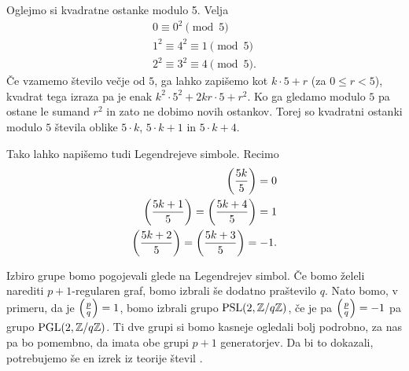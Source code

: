 \begin{primer}
    Oglejmo si kvadratne ostanke modulo 5.
    Velja
    \begin{align*}
        0 \equiv 0^2 \pmod 5            \\
        1^2 \equiv 4^2 \equiv 1 \pmod 5 \\
        2^2 \equiv 3^2 \equiv 4 \pmod 5.
    \end{align*}
    Če vzamemo število večje od \(5\), ga lahko zapišemo kot \(k\cdot 5 + r\) (za \(0\leq r <5\)), kvadrat tega izraza pa je enak \(k^2\cdot 5^2 + 2kr\cdot 5 + r^2\). Ko ga gledamo modulo \(5\) pa ostane le sumand \(r^2\) in zato ne dobimo novih ostankov. Torej so kvadratni ostanki modulo \(5\) števila oblike \(5\cdot k\), \(5\cdot k + 1\) in \(5\cdot k + 4\).

    Tako lahko napišemo tudi Legendrejeve simbole. Recimo
    \begin{align*}
        \left(\frac{5k}{5}\right) = 0                            \\
        \left(\frac{5k + 1}{5}\right) = \left(\frac{5k + 4}{5}\right) = 1 \\
        \left(\frac{5k + 2}{5}\right) = \left(\frac{5k + 3}{5}\right) = -1.
    \end{align*}
\end{primer}

Izbiro grupe bomo pogojevali glede na Legendrejev simbol. Če bomo želeli narediti \(p+1\)-regularen graf, bomo izbrali še dodatno praštevilo \(q\). Nato bomo, v primeru, da je \(\left(\frac{p}{q}\right)=1\), bomo izbrali grupo \(\operatorname{PSL}(2, \mathbb Z/q\mathbb Z)\), če je pa \(\left(\frac{p}{q}\right)=-1\) pa grupo \(\operatorname{PGL}(2, \mathbb Z/q\mathbb Z)\). Ti dve grupi si bomo kasneje ogledali bolj podrobno, za nas pa bo pomembno, da imata obe grupi \(p+1\) generatorjev. Da bi to dokazali, potrebujemo še en izrek iz teorije števil \cite{Hirschhorn_1982}.


